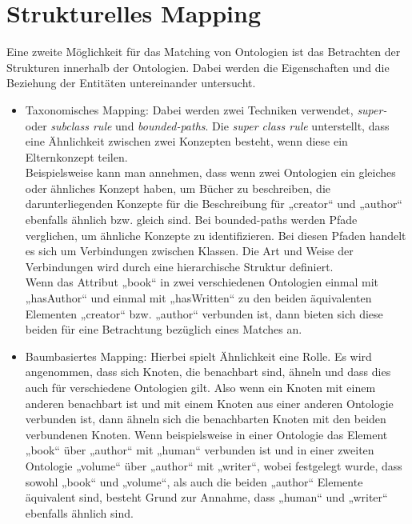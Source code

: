 	\section{Strukturelles Mapping}
	\label{StrukturellesMapping}
	Eine zweite Möglichkeit für das Matching von Ontologien ist das Betrachten der
	Strukturen innerhalb der Ontologien. Dabei werden die Eigenschaften und die
	Beziehung der Entitäten untereinander untersucht.
	\begin{itemize}
		\item Taxonomisches Mapping: Dabei werden zwei Techniken
		verwendet, \textit{super-} oder  \textit{subclass rule} und
		\textit{bounded-paths}. Die \textit{super class rule} unterstellt, dass eine
		Ähnlichkeit zwischen zwei Konzepten besteht, wenn diese ein Elternkonzept
		teilen. \cite{EuzShv07}\\
		Beispielsweise kann man annehmen, dass wenn zwei
		Ontologien ein gleiches oder ähnliches Konzept haben, um Bücher zu
		beschreiben, die darunterliegenden Konzepte für die Beschreibung für
		„creator“ und „author“ ebenfalls ähnlich bzw. gleich sind. Bei bounded-paths
		werden Pfade verglichen, um ähnliche Konzepte zu identifizieren. Bei diesen
		Pfaden handelt es sich um Verbindungen zwischen Klassen. Die Art und Weise der
		Verbindungen wird durch eine hierarchische Struktur definiert.\cite{EuzShv07}\\
		Wenn das Attribut „book“ in zwei verschiedenen Ontologien
		einmal mit „hasAuthor“ und einmal mit „hasWritten“ zu den beiden äquivalenten
		Elementen „creator“ bzw. „author“ verbunden ist, dann bieten sich diese beiden
		für eine Betrachtung bezüglich eines Matches an.
		\item Baumbasiertes Mapping: Hierbei spielt Ähnlichkeit eine
		Rolle.
		Es wird angenommen, dass sich Knoten, die benachbart sind, ähneln und dass
		dies auch für verschiedene Ontologien gilt. Also wenn ein Knoten mit einem anderen
		benachbart ist und mit einem Knoten aus einer anderen Ontologie verbunden ist,
		dann ähneln sich die benachbarten Knoten mit den beiden verbundenen Knoten.
		Wenn beispielsweise in einer Ontologie das Element „book“ über „author“ mit „human“
		verbunden ist und in einer zweiten Ontologie „volume“ über „author“ mit
		„writer“, wobei festgelegt wurde, dass sowohl „book“ und „volume“, als auch
		die beiden „author“ Elemente äquivalent sind, besteht Grund zur Annahme, dass
		„human“ und „writer“ ebenfalls ähnlich sind.\cite{EuzShv07}
	\end{itemize}
	
